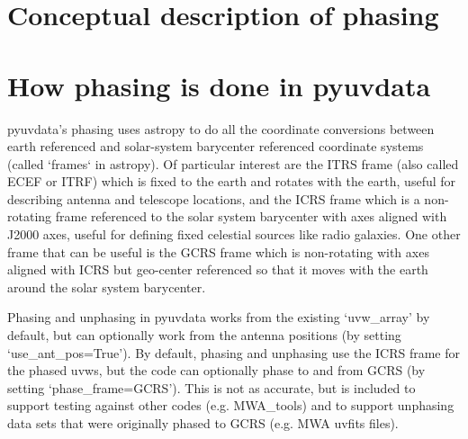 \documentclass[11pt, oneside]{article}   	%
\begin{document}
\section{Conceptual description of phasing}


\section{How phasing is done in pyuvdata}
pyuvdata's phasing uses astropy to do all the coordinate conversions between earth referenced and solar-system barycenter referenced coordinate systems (called `frames` in astropy). Of particular interest are the ITRS frame (also called ECEF or ITRF) which is fixed to the earth and rotates with the earth, useful for describing antenna and telescope locations, and the ICRS frame which is a non-rotating frame referenced to the solar system barycenter with axes aligned with J2000 axes, useful for defining fixed celestial sources like radio galaxies. One other frame that can be useful is the GCRS frame which is non-rotating with axes aligned with ICRS but geo-center referenced so that it moves with the earth around the solar system barycenter.

Phasing and unphasing in pyuvdata works from the existing `uvw\_array' by default, but can optionally work from the antenna positions (by setting `use\_ant\_pos=True'). By default, phasing and unphasing use the ICRS frame for the phased uvws, but the code can optionally phase to and from GCRS (by setting `phase\_frame=GCRS'). This is not as accurate, but is included to support testing against other codes (e.g. MWA\_tools) and to support unphasing data sets that were originally phased to GCRS (e.g. MWA uvfits files).
\end{document}
